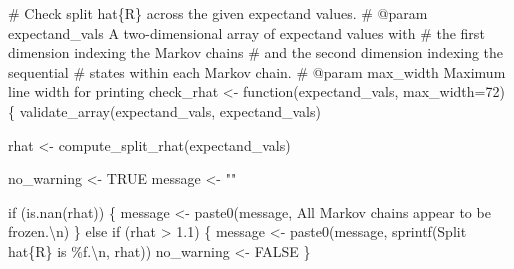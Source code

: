 \documentclass[
  letterpaper,
  DIV=11,
  numbers=noendperiod]{scrartcl}
\newenvironment{Shaded}{\begin{snugshade}}{\end{snugshade}}
\newcommand{\CharTok}[1]{\textcolor[rgb]{0.13,0.47,0.30}{#1}}
\newcommand{\CommentTok}[1]{\textcolor[rgb]{0.37,0.37,0.37}{#1}}
\newcommand{\ControlFlowTok}[1]{\textcolor[rgb]{0.00,0.23,0.31}{#1}}
\newcommand{\DecValTok}[1]{\textcolor[rgb]{0.68,0.00,0.00}{#1}}
\newcommand{\FloatTok}[1]{\textcolor[rgb]{0.68,0.00,0.00}{#1}}
\newcommand{\KeywordTok}[1]{\textcolor[rgb]{0.00,0.23,0.31}{#1}}
\newcommand{\NormalTok}[1]{\textcolor[rgb]{0.00,0.23,0.31}{#1}}
\newcommand{\OperatorTok}[1]{\textcolor[rgb]{0.37,0.37,0.37}{#1}}
\newcommand{\SpecialCharTok}[1]{\textcolor[rgb]{0.37,0.37,0.37}{#1}}
\newcommand{\StringTok}[1]{\textcolor[rgb]{0.13,0.47,0.30}{#1}}
\begin{document}
\begin{Shaded}
\begin{Highlighting}[]
\CommentTok{\# Check split hat\{R\} across the given expectand values.}
\CommentTok{\# @param expectand\_vals A two{-}dimensional array of expectand values with}
\CommentTok{\#                       the first dimension indexing the Markov chains}
\CommentTok{\#                       and the second dimension indexing the sequential}
\CommentTok{\#                       states within each Markov chain.}
\CommentTok{\# @param max\_width Maximum line width for printing}
\NormalTok{check\_rhat }\OperatorTok{\textless{}{-}}\NormalTok{ function(expectand\_vals, max\_width}\OperatorTok{=}\DecValTok{72}\NormalTok{) \{}
\NormalTok{  validate\_array(expectand\_vals, }\StringTok{\textquotesingle{}expectand\_vals\textquotesingle{}}\NormalTok{)}

\NormalTok{  rhat }\OperatorTok{\textless{}{-}}\NormalTok{ compute\_split\_rhat(expectand\_vals)}

\NormalTok{  no\_warning }\OperatorTok{\textless{}{-}}\NormalTok{ TRUE}
\NormalTok{  message }\OperatorTok{\textless{}{-}} \StringTok{""}

  \ControlFlowTok{if}\NormalTok{ (}\KeywordTok{is}\NormalTok{.nan(rhat)) \{}
\NormalTok{    message }\OperatorTok{\textless{}{-}}\NormalTok{ paste0(message, }
                      \StringTok{\textquotesingle{}All Markov chains appear to be frozen.}\CharTok{\textbackslash{}n}\StringTok{\textquotesingle{}}\NormalTok{)}
\NormalTok{  \} }\ControlFlowTok{else} \ControlFlowTok{if}\NormalTok{ (rhat }\OperatorTok{\textgreater{}} \FloatTok{1.1}\NormalTok{) \{}
\NormalTok{    message }\OperatorTok{\textless{}{-}}\NormalTok{ paste0(message, sprintf(}\StringTok{\textquotesingle{}Split hat}\SpecialCharTok{\{R\}}\StringTok{ is }\SpecialCharTok{\%f}\StringTok{.}\CharTok{\textbackslash{}n}\StringTok{\textquotesingle{}}\NormalTok{, rhat))}
\NormalTok{    no\_warning }\OperatorTok{\textless{}{-}}\NormalTok{ FALSE}
\NormalTok{  \}}
  

\end{Highlighting}
\end{Shaded}
\end{document}
